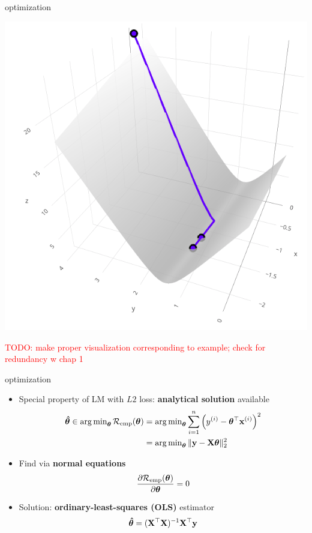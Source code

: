 \documentclass[11pt,compress,t,notes=noshow, xcolor=table]{beamer}
\begin{document}
\begin{frame}{optimization}
\begin{minipage}{0.5\textwidth}
    \includegraphics[width=\textwidth]{figure/ss_surf.png}
\end{minipage}

\vfill
\textcolor{red}{TODO: make proper visualization corresponding to example; check 
for redundancy w chap 1}

\end{frame}


\begin{vbframe}{optimization}

\begin{itemize}
    \item Special property of LM with $L2$ loss: \textbf{analytical solution}
    available
    \begin{align*}
        \bm{\hat\theta} \in 
        \operatorname{arg\,min}_{\bm{\theta}} \mathcal{R}_{\text{emp}}(\bm{\theta}) &=
        \operatorname{arg\,min}_{\bm{\theta}} \sum\limits_{i=1}^n \left(y^{(i)} - \bm{\theta}^\top \mathbf{x}^{(i)} \right)^2  \\
        &= \operatorname{arg\,min}_{\bm{\theta}} \| \mathbf{y} - \mathbf{X} \bm{\theta} \|^2_2
    \end{align*}
    \normalsize
    \item Find via \textbf{normal equations}
    $$\frac{\partial{\mathcal{R}_{\text{emp}}(\bm{\theta})}}{\partial \bm{\theta}} = 0$$
    \item Solution: \textbf{ordinary-least-squares (OLS)} estimator
    $$\bm{\hat\theta} = (\mathbf{X}^\top \mathbf{X})^{-1} \mathbf{X}^\top \mathbf{y}$$
\end{itemize}

\end{vbframe}
\end{document}
